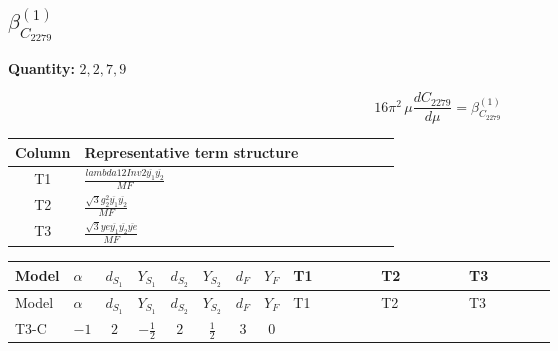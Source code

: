\documentclass[8pt]{article}
\begin{document}
\begin{landscape}
\section*{$\beta_{C_{2279}}^{(1)}$}
\noindent\textbf{Quantity: }$\mathrm{2,2,7,9}$\par\smallskip
\[16\pi^2\,\mu\frac{d C_{2279}}{d\mu}=\beta_{C_{2279}}^{(1)}\]
\begin{center}
\begin{tabular}{@{}c >{\raggedright\arraybackslash}p{0.82\linewidth}@{}}
\toprule
Column & Representative term structure \\
\midrule
T1 & \(\displaystyle \frac{lambda12Inv2 \overline{y_{1}} \overline{y_{2}}}{MF}\) \\
\midrule
T2 & \(\displaystyle \frac{\sqrt{3} g_{2}^{2} \overline{y_{1}} \overline{y_{2}}}{MF}\) \\
\midrule
T3 & \(\displaystyle \frac{\sqrt{3} ye \overline{y_{1}} \overline{y_{2}} \overline{ye}}{MF}\) \\
\midrule
\bottomrule
\end{tabular}
\end{center}
\smallskip
\tiny
\begin{longtable}{@{}llcccccc >{\raggedright\arraybackslash}p{0.21\linewidth} >{\raggedright\arraybackslash}p{0.21\linewidth} >{\raggedright\arraybackslash}p{0.21\linewidth}@{}}
\toprule
Model & $\alpha$ & $d_{S_1}$ & $Y_{S_1}$ & $d_{S_2}$ & $Y_{S_2}$ & $d_F$ & $Y_F$ & T1 & T2 & T3 \\
\midrule
\endfirsthead
\toprule
Model & $\alpha$ & $d_{S_1}$ & $Y_{S_1}$ & $d_{S_2}$ & $Y_{S_2}$ & $d_F$ & $Y_F$ & T1 & T2 & T3 \\
\midrule
\endhead
T3-C & $-1$ & $2$ & $-\frac{1}{2}$ & $2$ & $\frac{1}{2}$ & $3$ & $0$ & \scriptsize\adjustbox{max width=\linewidth}{$\begin{gathered} - \frac{lambda12Inv2 \overline{y_{1}} \overline{y_{2}}}{3 MF}\end{gathered}$} & \scriptsize\adjustbox{max width=\linewidth}{$\begin{gathered} - \frac{\sqrt{3} g_{2}^{2} \overline{y_{1}} \overline{y_{2}}}{4 MF}\end{gathered}$} & \scriptsize\adjustbox{max width=\linewidth}{$\begin{gathered} \frac{\sqrt{3} ye \overline{y_{1}} \overline{y_{2}} \overline{ye}}{12 MF}\end{gathered}$} \\
\midrule
\bottomrule
\end{longtable}
\clearpage

\end{landscape}
\end{document}
